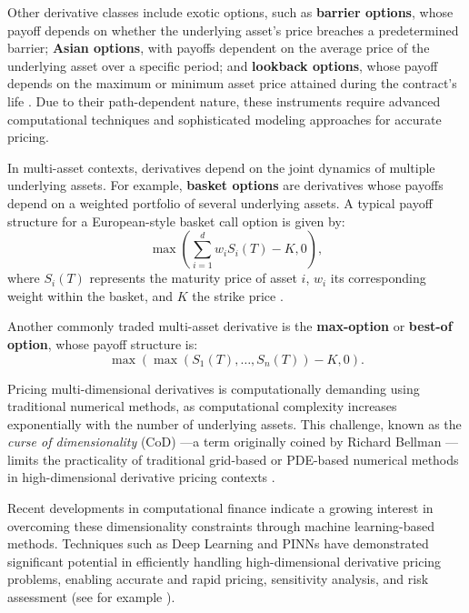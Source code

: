 \documentclass[12pt]{report} %
\theoremstyle{plain}           %
\theoremstyle{definition}      %
\theoremstyle{remark}          %
\begin{document}
Other derivative classes include exotic options, such as \textbf{barrier options}, whose payoff 
depends on whether the underlying asset's price breaches a predetermined barrier; 
\textbf{Asian options}, with payoffs dependent on the average price of the underlying asset over a 
specific period; and \textbf{lookback options}, whose payoff depends on the maximum or minimum asset 
price attained during the contract's life \cite{alma99148840908702021, Wilmott2010PaulWO}. Due to their path-dependent 
nature, these instruments require advanced computational techniques and sophisticated modeling 
approaches for accurate pricing.

In multi-asset contexts, derivatives depend on the joint dynamics of multiple underlying assets. For 
example, \textbf{basket options} are derivatives whose payoffs depend on a weighted portfolio 
of several underlying assets. A typical payoff structure for a European-style basket call option 
is given by:
\begin{equation}
\max\left(\sum_{i=1}^d w_i S_i(T) - K, 0\right),
\label{basket_payoff}
\end{equation}
where \(S_i(T)\) represents the maturity price of asset \(i\), \(w_i\) its corresponding weight 
within the basket, and \(K\) the strike price \cite{glasserman2004monte, alma99148840908702021}.

Another commonly traded multi-asset derivative is the \textbf{max-option} or \textbf{best-of option}, whose payoff structure is:
\begin{equation}
\max\left(\max (S_1(T),\dots,S_n(T)) - K, 0\right).
\label{best_of_payoff}
\end{equation}

Pricing multi-dimensional derivatives is computationally demanding using traditional numerical 
methods, as computational complexity increases exponentially with the number of underlying assets. 
This challenge, known as the \textit{curse of dimensionality} (CoD) —a term originally coined by 
Richard Bellman \cite{bellman1966dynamic}—limits the practicality of traditional grid-based or PDE-based 
numerical methods in high-dimensional derivative pricing contexts \cite{glasserman2004monte,Wilmott2010PaulWO}.

Recent developments in computational finance indicate a growing interest in overcoming these 
dimensionality constraints through machine learning-based methods. Techniques such as Deep 
Learning and PINNs have demonstrated significant potential 
in efficiently handling high-dimensional derivative pricing problems, enabling accurate and 
rapid pricing, sensitivity analysis, and risk assessment (see for example 
\cite{huge2020differentialmachinelearning, crépey2024cvasensitivitieshedgingrisk, heaton2018deeplearningfinance}).
\end{document}
